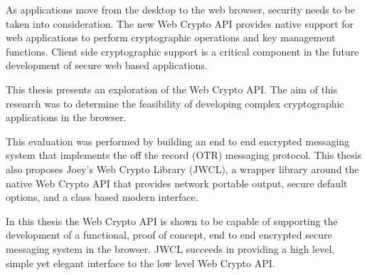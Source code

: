 As applications move from the desktop to the web browser, security needs to be taken into consideration. The new Web Crypto API provides native support for web applications to perform cryptographic operations and key management functions. Client side cryptographic support is a critical component in the future development of secure web based applications.


This thesis presents an exploration of the Web Crypto API. The aim of this research was to determine the feasibility of developing complex cryptographic applications in the browser.


This evaluation was performed by building an end to end encrypted messaging system that implements the off the record (OTR) messaging protocol. This thesis also proposes Joey's Web Crypto Library (JWCL), a wrapper library around the native Web Crypto API that provides network portable output, secure default options, and a class based modern interface. 


In this thesis the Web Crypto API is shown to be capable of supporting the development of a functional, proof of concept, end to end encrypted secure messaging system in the browser. JWCL succeeds in providing a high level, simple yet elegant interface to the low level Web Crypto API.      
